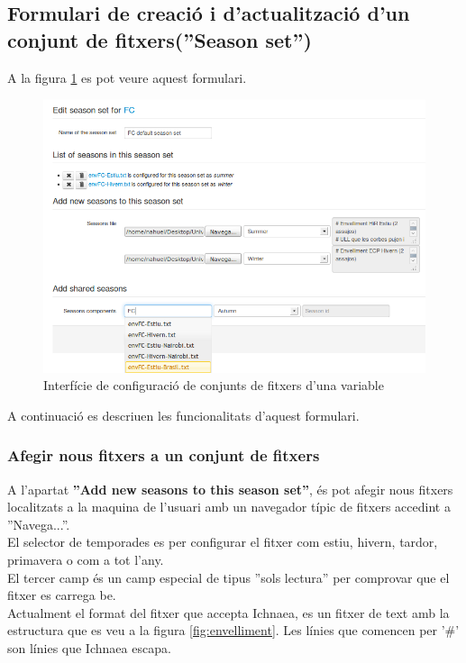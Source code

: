\subsection{Formulari de creació i d'actualització d'un conjunt de fitxers(''Season set'')}
A la figura \ref{fig:seasonSetEdition} es pot veure aquest formulari.
\label{season_set:variable}
\begin{figure}[h!]
  \centering
  \includegraphics[scale=0.5]{img/userguide/season_set_edition.png}
  \caption{Interfície de configuraci\'{o} de conjunts de fitxers d'una variable}
  \label{fig:seasonSetEdition}
\end{figure}
A continuació es descriuen les funcionalitats d'aquest formulari.

\subsubsection{Afegir nous fitxers a un conjunt de fitxers}
A l'apartat \textbf{''Add new seasons to this season set''}, \'{e}s pot afegir nous fitxers localitzats a la maquina de l'usuari amb un navegador típic de fitxers accedint a ''Navega...''. \\

El selector de temporades es per configurar el fitxer com estiu, hivern, tardor, primavera o com a tot l'any.\\

El tercer camp \'{e}s un camp especial de tipus ''sols lectura'' per comprovar que el fitxer es carrega be.\\

Actualment el format del fitxer que accepta Ichnaea, es un fitxer de text amb la estructura que es veu a la figura \ref{fig:envelliment}. Les línies que comencen per '\#' son línies que Ichnaea escapa.

